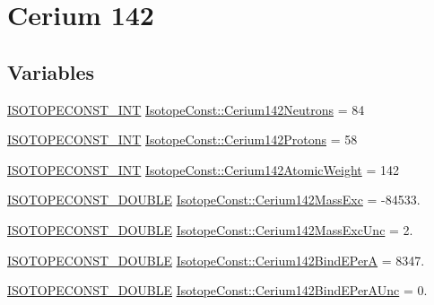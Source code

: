 \hypertarget{group___isotope_const-_cerium-_ce142}{}\section{Cerium 142}
\label{group___isotope_const-_cerium-_ce142}
\subsection*{Variables}
\begin{DoxyCompactItemize}
\item 
\mbox{\hyperlink{group___isotope_const-_macros_ga5f18360b3e99483a35c32d789e62621c}{I\+S\+O\+T\+O\+P\+E\+C\+O\+N\+S\+T\+\_\+\+I\+NT}} \mbox{\hyperlink{group___isotope_const-_cerium-_ce142_ga807b9dd8f77fbaf9d8af4005c6f62a36}{Isotope\+Const\+::\+Cerium142\+Neutrons}} = 84
\item 
\mbox{\hyperlink{group___isotope_const-_macros_ga5f18360b3e99483a35c32d789e62621c}{I\+S\+O\+T\+O\+P\+E\+C\+O\+N\+S\+T\+\_\+\+I\+NT}} \mbox{\hyperlink{group___isotope_const-_cerium-_ce142_gac351db6ff8cae1f2a9876381a447e7e3}{Isotope\+Const\+::\+Cerium142\+Protons}} = 58
\item 
\mbox{\hyperlink{group___isotope_const-_macros_ga5f18360b3e99483a35c32d789e62621c}{I\+S\+O\+T\+O\+P\+E\+C\+O\+N\+S\+T\+\_\+\+I\+NT}} \mbox{\hyperlink{group___isotope_const-_cerium-_ce142_gaa8ba8a43904a5d60821731d5b0037e91}{Isotope\+Const\+::\+Cerium142\+Atomic\+Weight}} = 142
\item 
\mbox{\hyperlink{group___isotope_const-_macros_ga8f45a7272ce02c0b4c65c44636ed719a}{I\+S\+O\+T\+O\+P\+E\+C\+O\+N\+S\+T\+\_\+\+D\+O\+U\+B\+LE}} \mbox{\hyperlink{group___isotope_const-_cerium-_ce142_ga2c3f3dd958f3a7e325bc58a247335596}{Isotope\+Const\+::\+Cerium142\+Mass\+Exc}} = -\/84533.
\item 
\mbox{\hyperlink{group___isotope_const-_macros_ga8f45a7272ce02c0b4c65c44636ed719a}{I\+S\+O\+T\+O\+P\+E\+C\+O\+N\+S\+T\+\_\+\+D\+O\+U\+B\+LE}} \mbox{\hyperlink{group___isotope_const-_cerium-_ce142_ga5f83a2368826aaefaa83c2e26f4a7ed5}{Isotope\+Const\+::\+Cerium142\+Mass\+Exc\+Unc}} = 2.
\item 
\mbox{\hyperlink{group___isotope_const-_macros_ga8f45a7272ce02c0b4c65c44636ed719a}{I\+S\+O\+T\+O\+P\+E\+C\+O\+N\+S\+T\+\_\+\+D\+O\+U\+B\+LE}} \mbox{\hyperlink{group___isotope_const-_cerium-_ce142_ga0da4f4cf831ee4afaa1d4495775ac1db}{Isotope\+Const\+::\+Cerium142\+Bind\+E\+PerA}} = 8347.
\item 
\mbox{\hyperlink{group___isotope_const-_macros_ga8f45a7272ce02c0b4c65c44636ed719a}{I\+S\+O\+T\+O\+P\+E\+C\+O\+N\+S\+T\+\_\+\+D\+O\+U\+B\+LE}} \mbox{\hyperlink{group___isotope_const-_cerium-_ce142_ga8ed166ff2af5d8af03ec98e65414565f}{Isotope\+Const\+::\+Cerium142\+Bind\+E\+Per\+A\+Unc}} = 0.

\end{DoxyCompactItemize}
